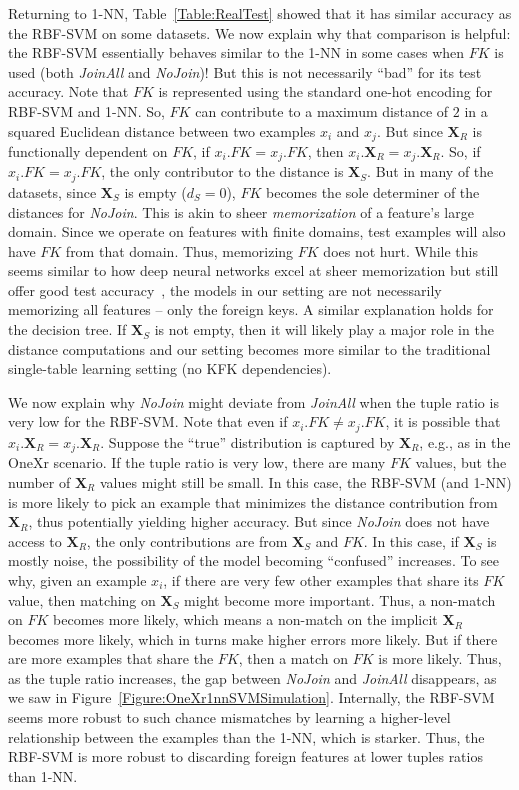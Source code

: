 \documentclass[sigconf]{acmart}
\begin{document}
Returning to 1-NN, Table~\ref{Table:RealTest} showed that it has similar accuracy as the RBF-SVM on some datasets. We now explain why that comparison is helpful: the RBF-SVM 
essentially behaves similar to the 1-NN in some cases when $FK$ is used (both \textit{JoinAll} and \textit{NoJoin})! But this is not necessarily ``bad'' for its test accuracy.
Note that $FK$ is represented using the standard one-hot encoding for RBF-SVM and 1-NN. So, $FK$ can contribute to a maximum distance of $2$ in a squared Euclidean distance between 
two examples $x_i$ and $x_j$.
But since $\textbf{X}_R$ is functionally dependent on $FK$, if $x_i.FK = x_j.FK$, then $x_i.\textbf{X}_R = x_j.\textbf{X}_R$. So, if $x_i.FK = x_j.FK$, the only contributor to 
the distance is $\textbf{X}_S$. But in many of the datasets, since $\textbf{X}_S$ is empty ($d_S = 0$), $FK$ becomes the sole determiner of the distances for \textit{NoJoin}.
This is akin to sheer \textit{memorization} of a feature's large domain. Since we operate on features with finite domains, test examples will also have $FK$ from that domain. 
Thus, memorizing $FK$ does not hurt. While this seems similar to how deep neural networks excel at sheer memorization but still offer good test accuracy~\cite{rechtdnn}, 
the models in our setting are not necessarily memorizing all features -- only the foreign keys.
A similar explanation holds for the decision tree. If $\textbf{X}_S$ is not empty, then it will likely play a major role in the distance computations and our setting 
becomes more similar to the traditional single-table learning setting (no KFK dependencies).

We now explain why \textit{NoJoin} might deviate from \textit{JoinAll} when the tuple ratio is very low for the RBF-SVM. Note that even if $x_i.FK \ne x_j.FK$, it is possible that 
$x_i.\textbf{X}_R = x_j.\textbf{X}_R$. Suppose the ``true'' distribution is captured by $\textbf{X}_R$, e.g., as in the OneXr scenario. 
If the tuple ratio is very low, there are many $FK$ values, but the number of $\textbf{X}_R$ values might still be small. In this case, the RBF-SVM (and 1-NN) is more 
likely to pick an example that minimizes the distance contribution from $\textbf{X}_R$, thus potentially yielding higher accuracy. But since \textit{NoJoin} does not have access to 
$\textbf{X}_R$, the only contributions are from $\textbf{X}_S$ and $FK$. In this case, if $\textbf{X}_S$ is mostly noise, the possibility of the model becoming ``confused'' 
increases. To see why, given an example $x_i$, if there are very few other examples that share its $FK$ value, then matching on $\textbf{X}_S$ might
become more important. Thus, a non-match on $FK$ becomes more likely, which means a non-match on the implicit $\textbf{X}_R$ becomes more likely, which in turns make higher errors
more likely. But if there are more examples that share the $FK$, then a match on $FK$ is more likely. Thus, as the tuple ratio increases, the gap between \textit{NoJoin} 
and \textit{JoinAll} disappears, as we saw in Figure~\ref{Figure:OneXr1nnSVMSimulation}. Internally, the RBF-SVM seems more robust to such chance mismatches by learning a higher-level 
relationship between the examples than the 1-NN, which is starker. Thus, the RBF-SVM is more robust to discarding foreign features at lower tuples ratios than 1-NN.
\end{document}
